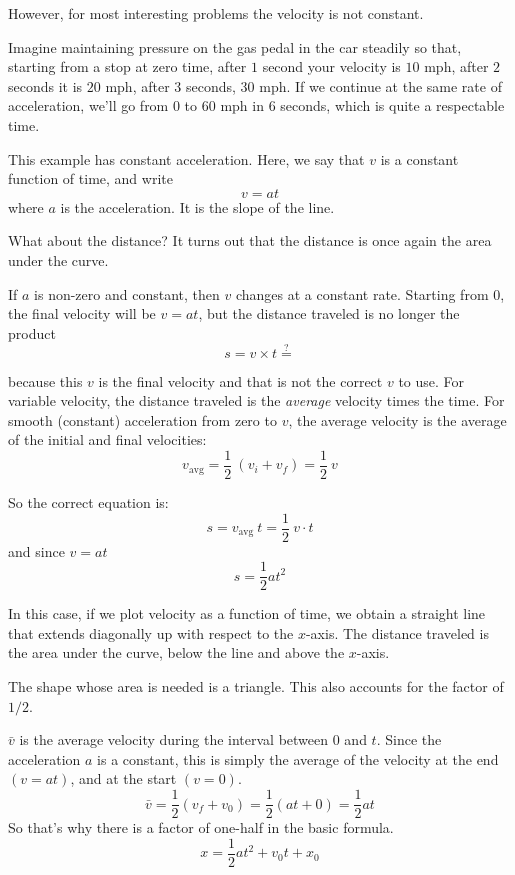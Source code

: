 \documentclass[11pt, oneside]{article}
\begin{document}
However, for most interesting problems the velocity is not constant.  

Imagine maintaining pressure on the gas pedal in the car steadily so that, starting from a stop at zero time, after $1$ second your velocity is $10$ mph, after $2$ seconds it is $20$ mph, after $3$ seconds, $30$ mph. If we continue at the same rate of acceleration, we'll go from $0$ to $60$ mph in $6$ seconds, which is quite a respectable time.

This example has constant acceleration.  Here, we say that $v$ is a constant function of time, and write 
\[ v = at \]
where $a$ is the acceleration.  It is the slope of the line.

What about the distance?  It turns out that the distance is once again the area under the curve.

If $a$ is non-zero and constant, then $v$ changes at a constant rate.  Starting from $0$, the final velocity will be $v = at$, but the distance traveled is no longer the product 
\[ s = v \times t \stackrel{?}{=}  \]

because this $v$ is the final velocity and that is not the correct $v$ to use.  For variable velocity, the distance traveled is the \emph{average} velocity times the time.  For smooth (constant) acceleration from zero to $v$, the average velocity is the average of the initial and final velocities:
\[ v_{\text{avg}} = \frac{1}{2} \ (v_i + v_f) = \frac{1}{2} \ v \]

So the correct equation is:
\[ s = v_{\text{avg}}\ t  = \frac{1}{2} \ v \cdot t \]
and since $v = at$
\[ s = \frac{1}{2} at^2 \]

In this case, if we plot velocity as a function of time, we obtain a straight line that extends diagonally up with respect to the $x$-axis.  The distance traveled is the area under the curve, below the line and above the $x$-axis.  

The shape whose area is needed is a triangle.  This also accounts for the factor of $1/2$.

$\bar{v}$ is the average velocity during the interval between $0$ and $t$.  Since the acceleration $a$ is a constant, this is simply the average of the velocity at the end $(v = at)$, and at the start $(v = 0)$.
\[ \bar{v} = \frac{1}{2} (v_f + v_0) = \frac{1}{2} (at + 0) = \frac{1}{2} at \]
So that's why there is a factor of one-half in the basic formula.
\[ x = \frac{1}{2}at^2 + v_0 t + x_0 \]
\end{document}

